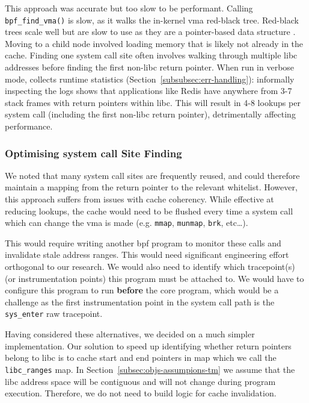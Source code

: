 This approach was accurate but too slow to be performant. Calling \texttt{bpf\_find\_vma()} is
slow, as it walks the in-kernel \ac{vma} red-black tree. Red-black trees scale
well but are slow to use as they are a pointer-based data structure \cite{pointer-based-ds-slow}. Moving to
a child node involved loading memory that is likely not already in the cache.
Finding one system call site often involves walking through multiple \ac{libc}
addresses before finding the first non-\ac{libc} return pointer. When run in
verbose mode, \af collects runtime statistics
(Section~\ref{subsubsec:err-handling}): informally inspecting the logs shows that
applications like Redis have anywhere from 3-7 stack frames with return pointers 
within \ac{libc}. This will result in 4-8 lookups per system call (including the
first non-\ac{libc} return pointer), detrimentally affecting performance.

\subsubsection{Optimising system call Site
Finding}\label{subsubsec:impl-find-site-opt}

We noted that many system call sites are frequently reused, and could
therefore maintain a mapping from the return pointer to the relevant whitelist. However,
this approach suffers from issues with cache coherency. While effective at
reducing lookups, the cache would need to be flushed every time a system call which
can change the \ac{vma} is made (e.g. \texttt{mmap}, \texttt{munmap},
\texttt{brk}, etc\dots). 

This would require writing another \ac{bpf} program to
monitor these calls and invalidate stale address ranges. This would need significant
engineering effort orthogonal to our research. We would also need to identify
which tracepoint(s) (or instrumentation points) this program must be
attached to. We would have to configure this program to run \textbf{before} the
\af core program, which would be a challenge as the first instrumentation point
in the system call path is the \texttt{sys\_enter} raw tracepoint.

Having considered these alternatives, we decided on a much simpler
implementation. Our solution to speed up identifying whether return pointers
belong to \ac{libc} is to cache  start and end pointers in 
map which we call the \texttt{libc\_ranges} map. In 
Section~\ref{subsec:objs-assumpions-tm} we assume that the  \ac{libc} address space 
will be contiguous and will not change during program execution. Therefore, we
do not need to build logic for cache invalidation.

